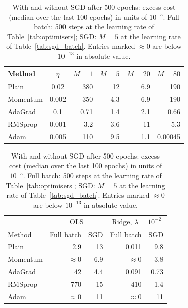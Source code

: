 \documentclass[aps,reprint,amsmath,amssymb,nofootinbib,floatfix]{revtex4-2}
\newcommand{\lb}{\bar\lambda}
\begin{document}
\begin{table}[t]
\begin{minipage}[t]{0.485\textwidth}
\caption{Excess cost of SGD for OLS after 1000 epochs (median over the last 100 epochs), in units
of $10^{-5}$, for the runs of Fig.~\ref{fig:sgd_batch}. $M=80$ is the full batch.}
\label{tab:sgd_batch}
\begin{ruledtabular}
\begin{tabular}{lcrrrr}
Method & $\eta$ & $M=1$ & $M=5$ & $M=20$ & $M=80$ \\
\hline
Plain & 0.02 & 380 & 12 & 6.9 & 190 \\
Momentum & 0.002 & 350 & 4.3 & 6.9 & 190 \\
AdaGrad & 0.1 & 0.71 & 1.4 & 2.1 & 0.66 \\
RMSprop & 0.001 & 3.2 & 3.6 & 11 & 5.3 \\
Adam & 0.005 & 110 & 9.5 & 1.1 & 0.00045 \\
\end{tabular}
\end{ruledtabular}
\end{minipage}\hfill
\begin{minipage}[t]{0.485\textwidth}
\caption{With and without SGD after 500 epochs: excess cost (median over the last 100 epochs) in
units of $10^{-5}$. Full batch: 500 steps at the learning rate of Table~\ref{tab:optimisers};
SGD: $M=5$ at the learning rate of Table~\ref{tab:sgd_batch}. Entries marked $\approx0$ are below
$10^{-13}$ in absolute value.}
\label{tab:sgd_full}
\begin{ruledtabular}
\begin{tabular}{lrrrr}
 & \multicolumn{2}{c}{OLS} & \multicolumn{2}{c}{Ridge, $\lb=10^{-2}$} \\
Method & Full batch & SGD & Full batch & SGD \\
\hline
Plain & 2.9 & 13 & 0.011 & 9.8 \\
Momentum & $\approx0$ & 6.9 & $\approx0$ & 3.8 \\
AdaGrad & 42 & 4.4 & 0.091 & 0.73 \\
RMSprop & 770 & 15 & 410 & 1.4 \\
Adam & $\approx0$ & 11 & $\approx0$ & 11 \\
\end{tabular}
\end{ruledtabular}
\end{minipage}
\end{table}
\end{document}
